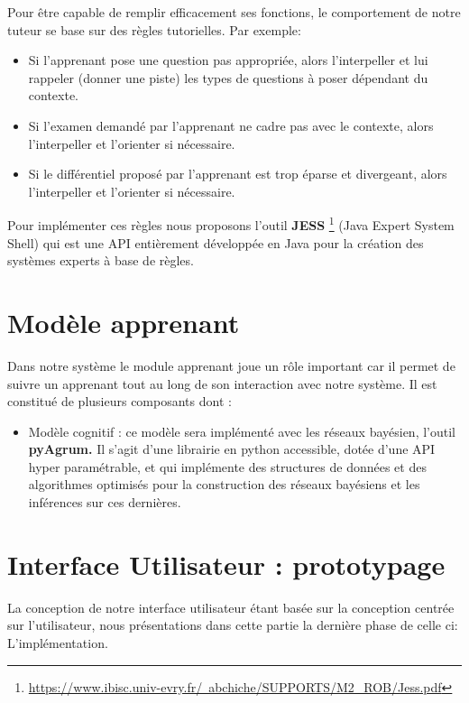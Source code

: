 Pour être capable de remplir efficacement ses fonctions, le comportement de notre tuteur se base sur des règles tutorielles. Par exemple:
\begin{itemize}
    \item Si l'apprenant pose une question pas appropriée, alors l'interpeller et lui rappeler (donner une piste) les types de questions à poser dépendant du contexte.
    \item Si l'examen demandé par l'apprenant ne cadre pas avec le contexte, alors l'interpeller et l'orienter si nécessaire.
    \item Si le différentiel proposé par l'apprenant est trop éparse et divergeant, alors l'interpeller et l'orienter si nécessaire.
\end{itemize}

Pour implémenter ces règles nous proposons l'outil \textbf{JESS} \footnote{\href{https://www.ibisc.univ-evry.fr/~abchiche/SUPPORTS/M2_ROB/Jess.pdf}{https://www.ibisc.univ-evry.fr/~abchiche/SUPPORTS/M2_ROB/Jess.pdf}} (Java Expert System Shell) qui est une API entièrement développée en Java pour la création des systèmes experts à base de règles.

\section{Modèle apprenant}
Dans notre système le module apprenant joue un rôle important car il permet de suivre un apprenant tout au long de son interaction avec notre système. Il est constitué de plusieurs composants dont  : 
\begin{itemize}
    \item Modèle cognitif : ce modèle sera implémenté avec les réseaux bayésien, l’outil \textbf{pyAgrum.} Il s’agit d’une librairie en python accessible, dotée d’une API hyper paramétrable, et qui implémente des structures de données et des algorithmes optimisés pour la construction des réseaux bayésiens et les inférences sur ces dernières.
\end{itemize}

\section{Interface Utilisateur : prototypage}

La conception de notre interface utilisateur étant basée sur la conception centrée sur l'utilisateur, nous présentations dans cette partie la dernière phase de celle ci: L'implémentation.

